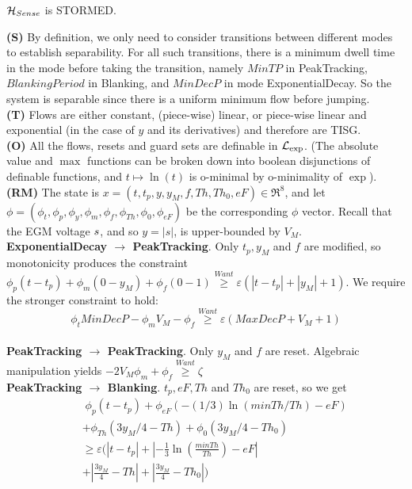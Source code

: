 \begin{thm}
	\label{thm:sensing}
	$\mathcal{H}_{Sense}$ is STORMED.	
\end{thm}
\begin{prf}
	\textbf{(S)} By definition, we only need to consider transitions between different modes to establish separability. 
	For all such transitions, there is a minimum dwell time in the mode before taking the transition, namely $MinTP$ in PeakTracking, $BlankingPeriod$ in Blanking, and  $MinDecP$ in mode ExponentialDecay.
	So the system is separable since there is a uniform minimum flow before jumping.
	\\
	\textbf{(T)} Flows are either constant, (piece-wise) linear, or piece-wise linear and exponential (in the case of $y$ and its derivatives) and therefore are TISG.
	\\
	\textbf{(O)} All the flows, resets and guard sets are definable in $\mathcal{L}_{\exp}$.
	(The absolute value and $\max$ functions can be broken down into boolean disjunctions of definable functions, and $t \mapsto \ln(t)$ is o-minimal by o-minimality of $\exp$).
	\\
	\textbf{(RM)} The state is $x = (t, t_p, y, y_M, f, Th, Th_0,eF) \in \Re^8$, and let 
	 $\phi = (\phi_t, \phi_{p}, \phi_y, \phi_m, \phi_f, \phi_{Th},\phi_0,\phi_{eF})$ be the corresponding $\phi$ vector.
	Recall that the \ac{EGM} voltage $s$, and so $y=|s|$, is upper-bounded by $V_M$.	
	\\ 
	\textbf{ExponentialDecay $\rightarrow$ PeakTracking}.
	Only $t_p,y_M$ and $f$ are modified, so monotonicity produces the constraint
	 $\phi_p(t-t_p) +\phi_m(0-y_M) + \phi_f(0-1) \stackrel{Want}{\geq} \varepsilon (|t-t_p|+|y_M|+1)$.
	We require the stronger constraint to hold:
	\[\phi_t MinDecP - \phi_m V_M -\phi_f \stackrel{Want}{\geq} \varepsilon(MaxDecP + V_M+1)\]
	\\
	\textbf{PeakTracking $\rightarrow$ PeakTracking}. Only $y_M$ and $f$ are reset. 
	Algebraic manipulation yields $-2V_M\phi_m + \phi_f \stackrel{Want}{\geq} \zeta$
	\\
	\textbf{PeakTracking $\rightarrow$ Blanking}.
	$t_p,eF,Th$ and $Th_0$ are reset, so we get
	\begin{eqnarray*}
	&&\;\phi_p(t-t_p) + \phi_{eF}(-(1/3)\ln(minTh/Th)-eF) 
	\\
	&&+\phi_{Th}(3y_M/4-Th) +\phi_0(3y_M/4-Th_0)
	\\
	&&\geq \varepsilon(|t-t_p|+ |-\frac{1}{3}\ln(\frac{minTh}{Th})-eF|
	\\
	&&+|\frac{3y_M}{4}-Th|+|\frac{3y_M}{4}-Th_0|)
	\end{eqnarray*}
	

\end{prf}
